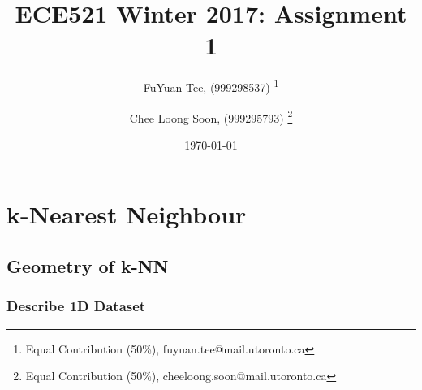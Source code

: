 \documentclass[a4paper,12pt]{article}
\title{ECE521 Winter 2017: Assignment 1}
\author{FuYuan Tee, (999298537)
  \thanks{Equal Contribution (50\%), fuyuan.tee@mail.utoronto.ca}
\and Chee Loong Soon, (999295793) \thanks{Equal Contribution (50\%),  cheeloong.soon@mail.utoronto.ca}}
\date{\today}
\begin{document}
\maketitle
\tableofcontents
\section{k-Nearest Neighbour}
\subsection{Geometry of k-NN}
\subsubsection{Describe 1D Dataset}
\end{document}
